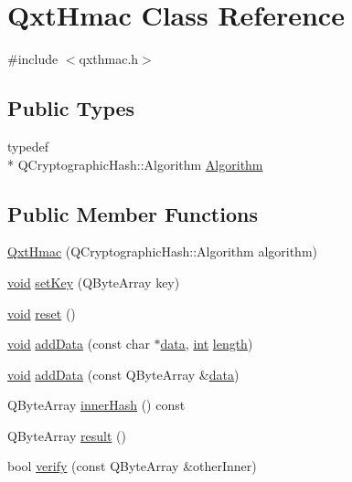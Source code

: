 \hypertarget{class_qxt_hmac}{\section{Qxt\-Hmac Class Reference}
\label{class_qxt_hmac}
}


{\ttfamily \#include $<$qxthmac.\-h$>$}

\subsection*{Public Types}
\begin{DoxyCompactItemize}
\item 
typedef \\*
Q\-Cryptographic\-Hash\-::\-Algorithm \hyperlink{class_qxt_hmac_a914fd8d1cfd8657a4cc77b091dbf73a5}{Algorithm}
\end{DoxyCompactItemize}
\subsection*{Public Member Functions}
\begin{DoxyCompactItemize}
\item 
\hyperlink{class_qxt_hmac_a68e35bcdcd26eba1925b0e2dd2bc0c65}{Qxt\-Hmac} (Q\-Cryptographic\-Hash\-::\-Algorithm algorithm)
\item 
\hyperlink{group___u_a_v_objects_plugin_ga444cf2ff3f0ecbe028adce838d373f5c}{void} \hyperlink{class_qxt_hmac_a0b4c43e530660244d49883086d715db4}{set\-Key} (Q\-Byte\-Array key)
\item 
\hyperlink{group___u_a_v_objects_plugin_ga444cf2ff3f0ecbe028adce838d373f5c}{void} \hyperlink{class_qxt_hmac_aa618f1cf583458683b61386e189b20aa}{reset} ()
\item 
\hyperlink{group___u_a_v_objects_plugin_ga444cf2ff3f0ecbe028adce838d373f5c}{void} \hyperlink{class_qxt_hmac_a7af4e2a71677ca523c9abf03c0f11d78}{add\-Data} (const char $\ast$\hyperlink{glext_8h_a8850df0785e6fbcc2351af3b686b8c7a}{data}, \hyperlink{ioapi_8h_a787fa3cf048117ba7123753c1e74fcd6}{int} \hyperlink{glext_8h_a3c8469415bbc83dd1341af15c67f1cef}{length})
\item 
\hyperlink{group___u_a_v_objects_plugin_ga444cf2ff3f0ecbe028adce838d373f5c}{void} \hyperlink{class_qxt_hmac_a896826e3d3eb125a8c849d0d96e2f0ce}{add\-Data} (const Q\-Byte\-Array \&\hyperlink{glext_8h_a8850df0785e6fbcc2351af3b686b8c7a}{data})
\item 
Q\-Byte\-Array \hyperlink{class_qxt_hmac_a8cc8a8bd765429dab6e7ee22e7a6e8b0}{inner\-Hash} () const 
\item 
Q\-Byte\-Array \hyperlink{class_qxt_hmac_a8f813f0d0eabfc24390d1aeb9a428abf}{result} ()
\item 
bool \hyperlink{class_qxt_hmac_a3e0f3abc9082dba244780ac573fc62ff}{verify} (const Q\-Byte\-Array \&other\-Inner)
\end{DoxyCompactItemize}
